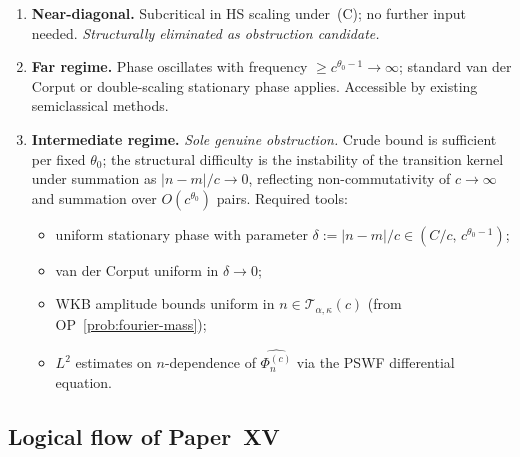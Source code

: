 \documentclass[12pt,a4paper]{amsart}
\theoremstyle{definition}
\theoremstyle{remark}
\begin{document}
\begin{enumerate}[\rm(i)]
\item \textbf{Near-diagonal.}
  Subcritical in HS scaling under~(C);
  no further input needed.
  \emph{Structurally eliminated as
  obstruction candidate.}

\item \textbf{Far regime.}
  Phase oscillates with frequency
  $\ge c^{\theta_0-1}\to\infty$;
  standard van der Corput or
  double-scaling stationary phase
  applies.
  Accessible by existing
  semiclassical methods.

\item \textbf{Intermediate regime.}
  \emph{Sole genuine obstruction.}
  Crude bound is sufficient per fixed
  $\theta_0$; the structural
  difficulty is the instability of
  the transition kernel under
  summation as $|n-m|/c\to 0$,
  reflecting non-commutativity of
  $c\to\infty$ and summation over
  $O(c^{\theta_0})$ pairs.
  Required tools:
  \begin{itemize}[leftmargin=*]
  \item uniform stationary phase
    with parameter
    $\delta:=|n-m|/c\in
    (C/c,\,c^{\theta_0-1})$;
  \item van der Corput uniform in
    $\delta\to 0$;
  \item WKB amplitude bounds uniform
    in $n\in\mathcal{T}_{\alpha,\kappa}(c)$
    (from OP~\ref{prob:fourier-mass});
  \item $L^2$ estimates on
    $n$-dependence of
    $\widehat{\Phi_n^{(c)}}$
    via the PSWF differential equation.
  \end{itemize}
\end{enumerate}

\subsection{Logical flow of Paper~XV}

\begin{center}
\end{center}
\end{document}
